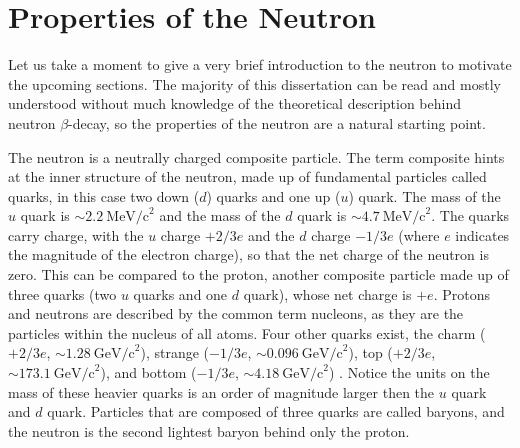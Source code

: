 \section{Properties of the Neutron}
\label{sec:neutronProperties}
Let us take a moment to give a very brief introduction to the neutron to motivate the
upcoming sections. The majority of this dissertation can be read and mostly understood
without much knowledge of the theoretical description behind neutron $\beta$-decay,
so the properties of the neutron are a natural starting point.

The neutron is a neutrally charged composite particle. The term
composite hints at the inner structure of the neutron, made up of fundamental
particles called quarks, in this case two down ($d$) quarks and one up ($u$) quark.
The mass of the $u$ quark is $\sim2.2~\mathrm{MeV/c}^2$ and the mass of the
$d$ quark is $\sim4.7~\mathrm{MeV/c}^2$.
The quarks carry charge, with the $u$ charge $+2/3e$ and the $d$ charge
$-1/3e$ (where $e$ indicates the magnitude of the electron charge),
so that the net charge of the neutron is zero. This can be compared
to the proton, another composite particle made up of three quarks (two $u$ quarks and
one $d$ quark), whose net charge is $+e$. Protons and neutrons are described
by the common term nucleons, as they are the particles within the nucleus of all
atoms. Four other quarks exist, 
the charm ($+2/3e$, $\sim1.28~\mathrm{GeV/c}^2$), strange ($-1/3e$, $\sim0.096~\mathrm{GeV/c}^2$),
top ($+2/3e$, $\sim173.1~\mathrm{GeV/c}^2$), and  bottom ($-1/3e$, $\sim4.18~\mathrm{GeV/c}^2$) \cite{pdg}. Notice
the units on the mass of these heavier quarks is an order of magnitude larger then the $u$ quark and $d$ quark.
Particles that are composed of three quarks are called baryons, and the neutron
is the second lightest baryon
behind only the proton.

